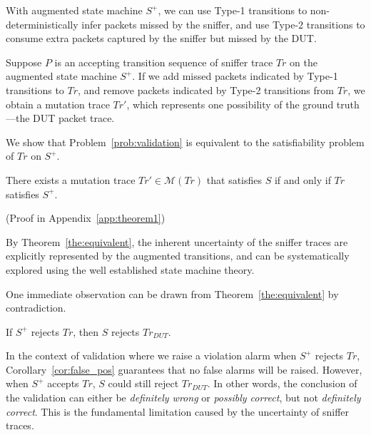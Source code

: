 With augmented state machine $S^+$, we can use Type-1 transitions to
non-deterministically infer packets missed by the sniffer, and use Type-2
transitions to consume extra
packets captured by the sniffer but missed by the DUT.

Suppose $P$ is an accepting transition sequence of sniffer trace $Tr$ on the
augmented state machine $S^+$. If we add missed packets indicated by Type-1
transitions to $Tr$, and remove packets indicated by Type-2 transitions from
$Tr$, we obtain a mutation trace $Tr'$, which represents one possibility of the
ground truth---the DUT packet trace.

We show that Problem~\ref{prob:validation} is equivalent to the
satisfiability problem of $Tr$ on $S^+$.

\begin{theorem}
  There exists a mutation trace $Tr' \in \mathcal{M}(Tr)$ that satisfies $S$ if
  and only if $Tr$ satisfies $S^+$.
 \label{the:equivalent}
\end{theorem}%
(Proof in Appendix~\ref{app:theorem1})

By Theorem~\ref{the:equivalent}, the inherent uncertainty of the sniffer traces
are explicitly represented by the augmented transitions, and can be
systematically explored using the well established state machine theory.

One immediate observation can be drawn from Theorem~\ref{the:equivalent} by
contradiction.

\begin{corollary}
  If $S^+$ rejects $Tr$, then $S$ rejects $Tr_{DUT}$.
  \label{cor:false_pos}
\end{corollary}
In the context of validation where we raise a violation alarm when $S^+$
rejects $Tr$, Corollary~\ref{cor:false_pos} guarantees that no false alarms will be
raised.
However, when $S^+$ accepts $Tr$, $S$ could still reject $Tr_{DUT}$.
In other words, the conclusion of the validation can either be \textit{definitely
wrong} or \textit{possibly correct}, but not \textit{definitely correct}.
This is the fundamental limitation caused by the uncertainty of sniffer traces.

